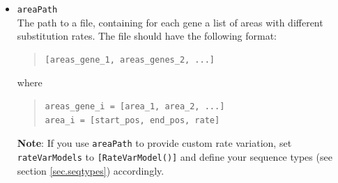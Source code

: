 \documentclass[11pt]{article}
\begin{document}
\begin{itemize}
\noindent The model definitions take the following parameters:
\begin{itemize}
\item{\texttt{model}} \hfill \\
possible values include:
\item{\texttt{areas}} \hfill \\
For \texttt{'Poisson'}: maximum number of areas with different rate within a gene. \hfill \\
For \texttt{'Gamma'}: number of rate classes. \hfill \\
\item{\texttt{motifFreq}} \hfill \\
Proportion of invariable sites (motifs)
\item{\texttt{alpha}} \hfill \\
Shape parameter of gamma distribution for gamma rates among sites.
\end{itemize}

\item{\texttt{areaPath}} \hfill \\
The path to a file, containing for each gene a list of areas with different substitution rates. The file should have the following format:
\begin{quote}
\begin{verbatim}
[areas_gene_1, areas_genes_2, ...]
\end{verbatim}
\end{quote}
\noindent where
\begin{quote}
\begin{verbatim}
areas_gene_i = [area_1, area_2, ...]
area_i = [start_pos, end_pos, rate]
\end{verbatim}
\end{quote}

\noindent \textbf{Note}: If you use \texttt{areaPath} to provide custom rate variation, set \texttt{rateVarModels} to \texttt{[RateVarModel()]} and define your sequence types (see section \ref{sec.seqtypes}) accordingly.
\end{itemize}
\end{document}

